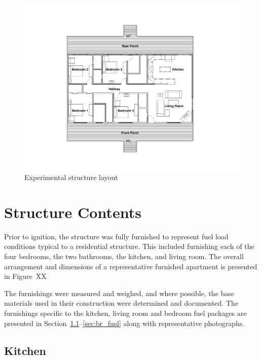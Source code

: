 \documentclass[12pt,oneside]{book}
\begin{document}
\begin{figure}[!htb]
	\includegraphics[width=1.1\linewidth]{../06_Figures/Search_Bldg_3}
	\caption{Experimental structure layout}
	\label{fig:Floor_Plan}
\end{figure}


\section{Structure Contents}

Prior to ignition, the structure was fully furnished to represent fuel load conditions typical to a residential structure. This included furnishing each of the four bedrooms, the two bathrooms, the kitchen, and living room. The overall arrangement and dimensions of a representative furnished apartment is presented in Figure~XX


The furnishings were measured and weighed, and where possible, the base materials used in their construction were determined and documented. The furnishings specific to the kitchen, living room and bedroom fuel packages are presented in Section~\ref{sec:kit_fuel}--\ref{sec:br_fuel} along with representative photographs.

\subsection{Kitchen}
\label{sec:kit_fuel}
\end{document}
